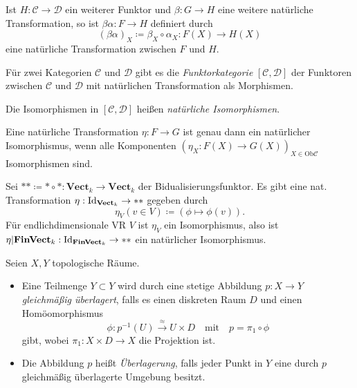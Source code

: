 \documentclass{cheat-sheet}
\newcommand{\Ob}{\mathrm{Ob}} %
\begin{document}
\begin{bem}
  Ist $H : \mathcal{C} \to \mathcal{D}$ ein weiterer Funktor und $\beta : G \to H$ eine weitere natürliche Transformation, so ist $\beta \alpha : F \to H$ definiert durch
  \[ (\beta \alpha)_X \coloneqq \beta_X \circ \alpha_X : F(X) \to H(X) \]
  eine natürliche Transformation zwischen $F$ und $H$.
\end{bem}

\begin{bem}
  Für zwei Kategorien $\mathcal{C}$ und $\mathcal{D}$ gibt es die \emph{Funktorkategorie} $\left[\mathcal{C}, \mathcal{D}\right]$ der Funktoren zwischen $\mathcal{C}$ und $\mathcal{D}$ mit natürlichen Transformation als Morphismen.
\end{bem}

\begin{defn}
  Die Isomorphismen in $\left[\mathcal{C}, \mathcal{D}\right]$ heißen \emph{natürliche Isomorphismen}.
\end{defn}

\begin{lem}
  Eine natürliche Transformation $\eta : F \to G$ ist genau dann ein natürlicher Isomorphismus, wenn alle Komponenten $(\eta_X : F(X) \to G(X))_{X \in \Ob \mathcal{C}}$ Isomorphismen sind.
\end{lem}

\begin{bsp}
  Sei $** \coloneqq * \circ * : \mathbf{Vect}_k \to \mathbf{Vect}_k$ der Bidualisierungsfunktor. Es gibt eine nat. Transformation $\eta : \mathrm{Id}_{\mathbf{Vect}_k} \to **$ gegeben durch
  \[ \eta_V(v \in V) \coloneqq (\phi \mapsto \phi(v)). \]
  Für endlichdimensionale VR $V$ ist $\eta_V$ ein Isomorphismus, also ist $\eta|\mathbf{FinVect}_k : \mathrm{Id}_{\mathbf{FinVect}_k} \to **$ ein natürlicher Isomorphismus.
\end{bsp}



\begin{defn}
  Seien $X, Y$ topologische Räume.
  \begin{itemize}
    \item Eine Teilmenge $Y \subset Y$ wird durch eine stetige Abbildung $p : X \to Y$ \emph{gleichmäßig überlagert}, falls es einen diskreten Raum $D$ und einen Homöomorphismus
    \[
      \phi : p^{-1}(U) \xrightarrow{\approx} U \times D
      \quad \text{mit} \quad
      p = \pi_1 \circ \phi
    \]
    gibt, wobei $\pi_1 : X \times D \to X$ die Projektion ist.
    \item Die Abbildung $p$ heißt \emph{Überlagerung}, falls jeder Punkt in $Y$ eine durch $p$ gleichmäßig überlagerte Umgebung besitzt.
  \end{itemize}
\end{defn}
\end{document}
